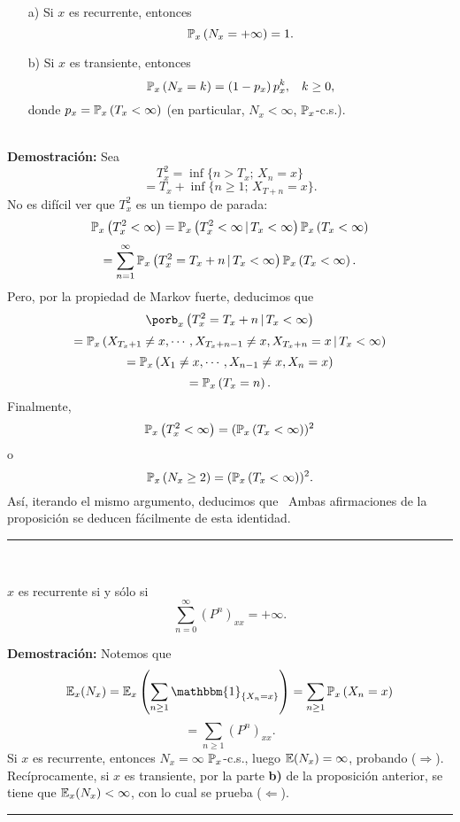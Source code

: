  \begin{prop}
    \begin{enumerate}
        \item[a)] Si $x$ es recurrente, entonces
        \[\mathbb{P}_x\left(N_x = +\infty\right) = 1.\]
        \item[b)] Si $x$ es transiente, entonces
        \[\mathbb{P}_x\left(N_x =k\right) = \left(1 - p_x\right)p_x^k,\hspace{0.3cm}k\geq 0,\]
        donde $p_x = \mathbb{P}_x\left(T_x<\infty\right)$ (en particular, $N_x<\infty$, $\mathbb{P}_x$-c.s.).
    \end{enumerate}
 \end{prop}\\ \newline
\textbf{Demostración: }Sea 
\[T_x^2 = \inf\{n> T_x;\,X_n=x\}\]
\[= T_x + \inf\{n\geq 1;\,X_{T+n}=x\}.\]
No es difícil ver que $T_x^2$ es un tiempo de parada:
\[\mathbb{P}_x\left(T_x^2 < \infty\right) = \mathbb{P}_x\left(T_x^2<\infty\,|\,T_x<\infty\right)\mathbb{P}_x\left(T_x<\infty\right)\]
\[= \sum_{n=1}^{\infty}\mathbb{P}_x\left(T_x^2= T_x + n\,|\,T_x<\infty\right)\mathbb{P}_x\left(T_x <\infty\right).\]
Pero, por la propiedad de Markov fuerte, deducimos que
\[\porb_x\left(T_x^2 = T_x +n\,|\,T_x<\infty\right)\]
\[=\mathbb{P}_x\left(X_{T_x +1}\neq x,\cdots,X_{T_x +n-1}\neq x,X_{T_x +n}=x\,|\,T_x<\infty\right)\]
\[= \mathbb{P}_x\left(X_1\neq x,\cdots,X_{n-1}\neq x,X_n=x\right)\]
\[=\mathbb{P}_x\left(T_x=n\right).\]
Finalmente,
\[\mathbb{P}_x\left(T_x^2<\infty\right)=(\mathbb{P}_x\left(T_x<\infty\right))^2\]
o
\[\mathbb{P}_x\left(N_x\geq 2\right) = (\mathbb{P}_x\left(T_x<\infty\right))^2.\]
Así, iterando el mismo argumento, deducimos que
\
Ambas afirmaciones de la proposición se deducen fácilmente de esta identidad.\\
\rule{0.7em}{0.7em}\\ \newline
\begin{cor}
$x$ es recurrente si y sólo si
\[\sum_{n=0}^{\infty}\left(P^n\right)_{xx} = +\infty.\]
\end{cor}
\textbf{Demostración: }Notemos que
\[\E_x(N_x) = \E_x\left(\sum_{n\geq 1}\mathbbm{1}_{\{X_n=x\}}\right) = \sum_{n\geq 1}\prob_x\left(X_n=x\right)\]
\[= \sum_{n\geq 1}\left(P^n\right)_{xx}.\]
Si $x$ es recurrente, entonces $N_x=\infty$ $\mathbb{P}_x$-c.s., luego $\mathbb E(N_x)=\infty$, probando ($\Longrightarrow$).\\ \newline
Recíprocamente, si $x$ es transiente, por la parte \textbf{b)} de la proposición anterior, se tiene que $\mathbb E_x(N_x)<\infty$, con lo cual se prueba ($\Longleftarrow$).\\
\rule{0.7em}{0.7em}\\ \newline

